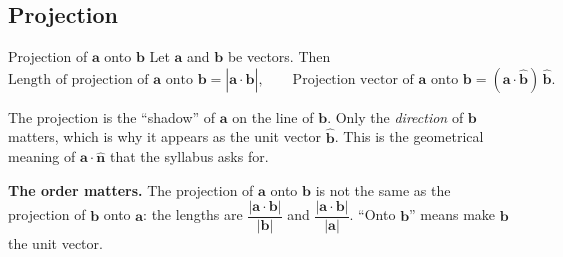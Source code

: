 \clearpage
\subsection{Projection}
\begin{definition}{Projection of $\mathbf{a}$ onto $\mathbf{b}$}
Let $\mathbf{a}$ and $\mathbf{b}$ be vectors. Then
\[
\text{Length of projection of $\mathbf{a}$ onto $\mathbf{b}$} = |\mathbf{a}\cdot\hat{\mathbf{b}}|,
\qquad
\text{Projection vector of $\mathbf{a}$ onto $\mathbf{b}$} = (\mathbf{a}\cdot\hat{\mathbf{b}})\,\hat{\mathbf{b}}.
\]
\end{definition}
The projection is the ``shadow'' of $\mathbf{a}$ on the line of $\mathbf{b}$. Only the \emph{direction} of $\mathbf{b}$ matters, which is why it appears as the unit vector $\hat{\mathbf{b}}$. This is the geometrical meaning of $\mathbf{a}\cdot\hat{\mathbf{n}}$ that the syllabus asks for.

\begin{center}
\end{center}

\begin{caution}
\textbf{The order matters.} The projection of $\mathbf{a}$ onto $\mathbf{b}$ is not the same as the projection of $\mathbf{b}$ onto $\mathbf{a}$: the lengths are $\dfrac{|\mathbf{a}\cdot\mathbf{b}|}{|\mathbf{b}|}$ and $\dfrac{|\mathbf{a}\cdot\mathbf{b}|}{|\mathbf{a}|}$. ``Onto $\mathbf{b}$'' means make $\mathbf{b}$ the unit vector.
\end{caution}

